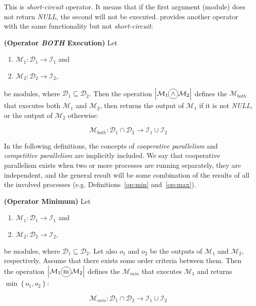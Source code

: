 This is {\it short-circuit} operator. It means that if the first argument (module) does not return {\it NULL}, the second will not be executed. \posl{} provides another operator with the same functionality but not {\it short-circuit}:

\begin{definition}\label{op:and}
{\bf (Operator {\it BOTH} Execution)} Let 
\begin{enumerate}%
	\item $\mathcal{M}_1 : \mathcal{D}_1 \rightarrow \mathcal{I}_1$ and  
	\item $\mathcal{M}_2 : \mathcal{D}_2 \rightarrow \mathcal{I}_2$,
\end{enumerate}%
be modules, where $\mathcal{D}_1 \subseteq \mathcal{D}_2$. %
Then the operation $\left|\mathcal{M}_1\circled{$\wedge$}\mathcal{M}_2\right|$ defines the \cm{} $\mathcal{M}_{both}$ that executes both $\mathcal{M}_1$ and $\mathcal{M}_2$, then returns the output of $\mathcal{M}_1$ if it is not {\it NULL}, or the output of $\mathcal{M}_2$ otherwise:

\[
\mathcal{M}_{both}:\mathcal{D}_1\cap\mathcal{D}_2 \rightarrow \mathcal{I}_1 \cup \mathcal{I}_2 
\]
\end{definition}

In the following definitions, the concepts of {\it cooperative parallelism} and {\it competitive parallelism} are implicitly included. We say that cooperative parallelism exists when two or more processes are running separately, they are independent, and the general result will be some combination of the results of all the involved processes (e.g. Definitions~\ref{op:min} and~\ref{op:max}). 

\begin{definition}\label{op:min}
{\bf (Operator Minimum)} Let
\begin{enumerate}%
	\item $\mathcal{M}_1 : \mathcal{D}_1 \rightarrow \mathcal{I}_1$ and  
	\item $\mathcal{M}_2 : \mathcal{D}_2 \rightarrow \mathcal{I}_2$,
\end{enumerate}%
be modules, where $\mathcal{D}_1 \subseteq \mathcal{D}_2$. %
Let also $o_1$ and $o_2$ be the outputs of $\mathcal{M}_1$ and $\mathcal{M}_2$, respectively. Assume that there exists some order criteria between them. Then the operation $\left|\mathcal{M}_1\circled{m}\mathcal{M}_2\right|$ defines the \cm{} $\mathcal{M}_{min}$ that executes $\mathcal{M}_1$ and returns $\min\left\{o_1,o_2\right\}$:

\[
\mathcal{M}_{min}:\mathcal{D}_1\cap\mathcal{D}_2 \rightarrow \mathcal{I}_1 \cup \mathcal{I}_2 
\]
\end{definition}

